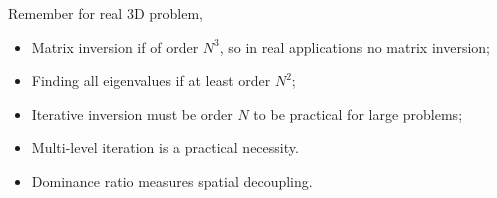 \documentclass{school-22.211-notes}
\begin{document}
\clearpage
{}
Remember for real 3D problem,
\begin{itemize}
\item Matrix inversion if of order $N^3$, so in real applications no matrix inversion;
\item Finding all eigenvalues if at least order $N^2$;
\item Iterative inversion must be order $N$ to be practical for large problems;
\item Multi-level iteration is a practical necessity. 
\item Dominance ratio measures spatial decoupling.
\end{itemize}
\end{document}
